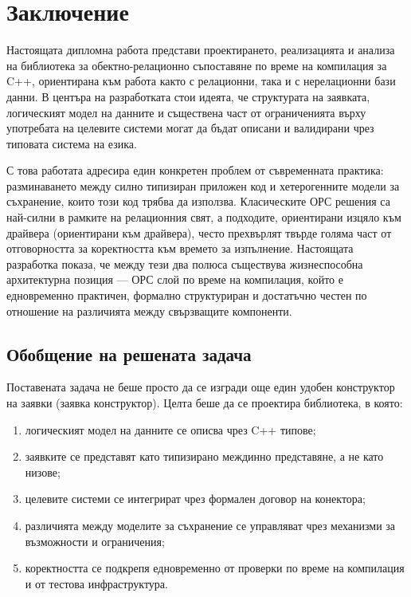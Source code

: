 \section{Заключение}
\label{sec:conclusion}

Настоящата дипломна работа представи проектирането, реализацията и анализа на библиотека за обектно-релационно съпоставяне по време на компилация за C++, ориентирана към работа както с релационни, така и с нерелационни бази данни. В центъра на разработката стои идеята, че структурата на заявката, логическият модел на данните и съществена част от ограниченията върху употребата на целевите системи могат да бъдат описани и валидирани чрез типовата система на езика.

С това работата адресира един конкретен проблем от съвременната практика: разминаването между силно типизиран приложен код и хетерогенните модели за съхранение, които този код трябва да използва. Класическите ОРС решения са най-силни в рамките на релационния свят, а подходите, ориентирани изцяло към драйвера (ориентирани към драйвера), често прехвърлят твърде голяма част от отговорността за коректността към времето за изпълнение. Настоящата разработка показа, че между тези два полюса съществува жизнеспособна архитектурна позиция --- ОРС слой по време на компилация, който е едновременно практичен, формално структуриран и достатъчно честен по отношение на различията между свързващите компоненти.

\subsection{Обобщение на решената задача}

Поставената задача не беше просто да се изгради още един удобен конструктор на заявки (заявка конструктор). Целта беше да се проектира библиотека, в която:

\begin{enumerate}[label=\arabic*.]
    \item логическият модел на данните се описва чрез C++ типове;
    \item заявките се представят като типизирано междинно представяне, а не като низове;
    \item целевите системи се интегрират чрез формален договор на конектора;
    \item различията между моделите за съхранение се управляват чрез механизми за възможности и ограничения;
    \item коректността се подкрепя едновременно от проверки по време на компилация и от тестова инфраструктура.
\end{enumerate}

